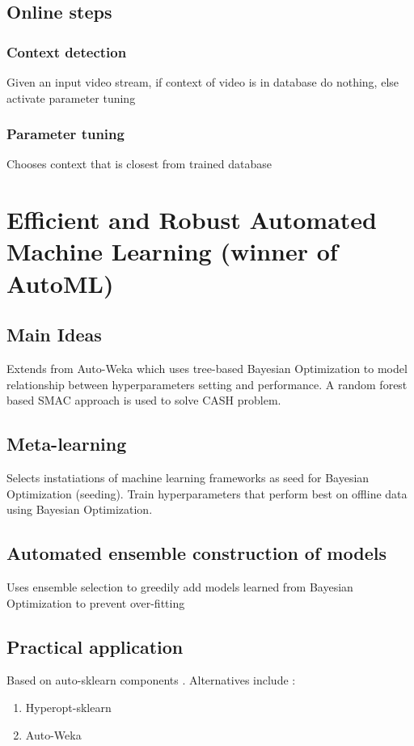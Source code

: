 \subsection{Online steps}

\subsubsection{Context detection}

Given an input video stream, if context of video is in database do nothing, else activate parameter tuning

\subsubsection{Parameter tuning}

Chooses context that is closest from trained database

\section{Efficient and Robust Automated Machine Learning (winner of AutoML)} \cite{feurer2015efficient}

\subsection{Main Ideas}
Extends from Auto-Weka which uses tree-based Bayesian Optimization \cite{thornton2013auto} to model relationship between hyperparameters setting and performance. A random forest based SMAC approach is used to solve CASH problem.

\subsection{Meta-learning}
Selects instatiations of machine learning frameworks as seed for Bayesian Optimization (seeding). Train hyperparameters that perform best on offline data using Bayesian Optimization.

\subsection{Automated ensemble construction of models}
Uses ensemble selection to greedily add models learned from Bayesian Optimization to prevent over-fitting 

\subsection{Practical application} \cite{NIPS2015_5872}
Based on auto-sklearn components . Alternatives include \cite{caruana2004ensemble}:
    \begin{enumerate}
        \item Hyperopt-sklearn \cite{komer2014hyperopt}
        \item Auto-Weka \cite{thornton2013auto}
    \end{enumerate}

